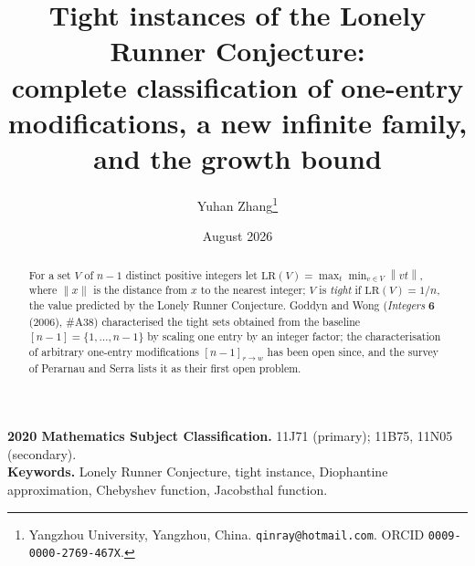 \documentclass[11pt]{article}
\title{Tight instances of the Lonely Runner Conjecture:\\
complete classification of one-entry modifications, a new infinite
family, and the growth bound}
\author{Yuhan Zhang\thanks{Yangzhou University, Yangzhou, China.
\texttt{qinray@hotmail.com}. ORCID \texttt{0009-0000-2769-467X}.}}
\date{August 2026}
\theoremstyle{definition}
\newcommand{\LR}{\mathrm{LR}}
\newcommand{\norm}[1]{\left\lVert #1 \right\rVert}
\begin{document}
\maketitle

\begin{center}
\small
\textbf{2020 Mathematics Subject Classification.} 11J71 (primary);
11B75, 11N05 (secondary).\\
\textbf{Keywords.} Lonely Runner Conjecture, tight instance, Diophantine
approximation, Chebyshev function, Jacobsthal function.
\end{center}

\begin{abstract}
For a set $V$ of $n-1$ distinct positive integers let
$\LR(V)=\max_t\min_{v\in V}\norm{vt}$, where $\norm{x}$ is the distance
from $x$ to the nearest integer; $V$ is \emph{tight} if $\LR(V)=1/n$,
the value predicted by the Lonely Runner Conjecture.  Goddyn and Wong
(\emph{Integers} \textbf{6} (2006), \#A38) characterised the tight sets
obtained from the baseline $[n-1]=\{1,\dots,n-1\}$ by scaling one entry
by an integer factor; the characterisation of arbitrary one-entry
modifications $[n-1]_{r\to w}$ has been open since, and the survey of
Perarnau and Serra lists it as their first open problem.


\end{abstract}
\end{document}
